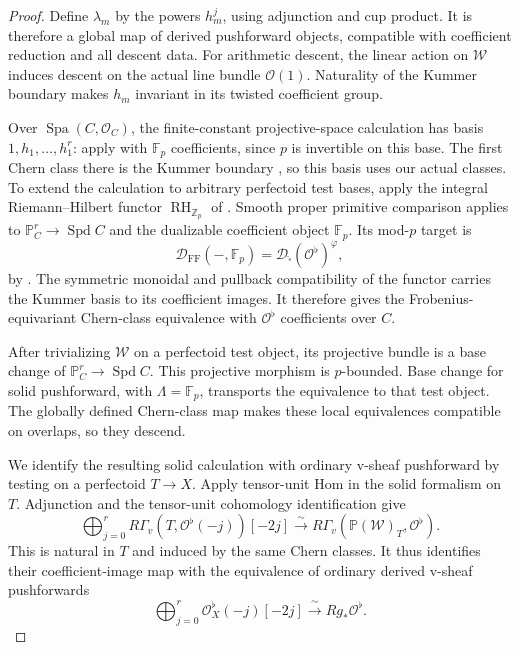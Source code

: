 \documentclass[11pt]{article}
\numberwithin{equation}{section}
\theoremstyle{definition}
\theoremstyle{remark}
\newcommand{\Z}{\mathbb Z}
\newcommand{\F}{\mathbb F}
\newcommand{\cO}{\mathcal O}
\DeclareMathOperator{\Spd}{Spd}
\begin{document}
\begin{proof}
Define $\lambda_m$ by the powers $h_m^j$, using adjunction and cup
product.  It is therefore a global map of derived pushforward objects,
compatible with coefficient reduction and all descent data.
For arithmetic descent, the linear action on $\mathcal W$ induces
descent on the actual line bundle $\cO(1)$.  Naturality of the Kummer
boundary makes $h_m$ invariant in its twisted coefficient group.

Over $\operatorname{Spa}(C,\cO_C)$, the finite-constant
projective-space calculation has basis
$1,h_1,\ldots,h_1^r$: apply
\cite[Construction~3.2.1 and Proposition~3.2.2]{LRZ2024}
with $\F_p$ coefficients, since $p$ is invertible on this base.
The first Chern class there is the Kummer boundary
\cite[Variant~3.1.8]{LRZ2024}, so this basis uses our actual classes.
To extend the calculation to arbitrary perfectoid test bases, apply
the integral Riemann--Hilbert functor
$\operatorname{RH}_{\Z_p}$ of \cite[Theorem~5.1.7]{ALM2026}.
Smooth proper primitive comparison
\cite[Proposition~5.2.2 and Example~5.2.3]{ALM2026} applies to
$\mathbb P_C^r\to\Spd C$ and the dualizable coefficient object
$\F_p$. Its mod-$p$ target is
\[
 \mathcal D_{\mathrm{FF}}(-,\F_p)
   =\mathcal D_{\widehat{\square}}(\cO^\flat)^{\varphi},
\]
by \cite[Remark~5.1.9 and the beginning of \S5.2]{ALM2026}.
The symmetric monoidal and pullback compatibility of the functor
carries the Kummer basis to its coefficient images. It therefore
gives the Frobenius-equivariant Chern-class equivalence with
$\cO^\flat$ coefficients over $C$.

After trivializing $\mathcal W$ on a perfectoid test object, its
projective bundle is a base change of $\mathbb P_C^r\to\Spd C$.
This projective morphism is $p$-bounded. Base change for solid
pushforward, \cite[Proposition~4.2.7(ii)]{ALM2026} with
$\Lambda=\F_p$, transports the equivalence to that test object.
The globally defined Chern-class map makes these local equivalences
compatible on overlaps, so they descend.

We identify the resulting solid calculation with ordinary v-sheaf
pushforward by testing on a perfectoid $T\to X$. Apply tensor-unit
Hom in the solid formalism on $T$. Adjunction and the tensor-unit
cohomology identification
\cite[Theorem~3.2.1(iii)--(iv)]{BMR2026} give
\[
 \bigoplus_{j=0}^r
    R\Gamma_v(T,\cO^\flat(-j))[-2j]
 \xrightarrow{\ \sim\ }
    R\Gamma_v(\mathbb P(\mathcal W)_T,\cO^\flat).
\]
This is natural in $T$ and induced by the same Chern classes.
It thus identifies their coefficient-image map with the equivalence
of ordinary derived v-sheaf pushforwards
\[
 \bigoplus_{j=0}^r\cO^\flat_X(-j)[-2j]
       \xrightarrow{\ \sim\ } Rg_*\cO^\flat.
\]


\end{proof}
\end{document}
